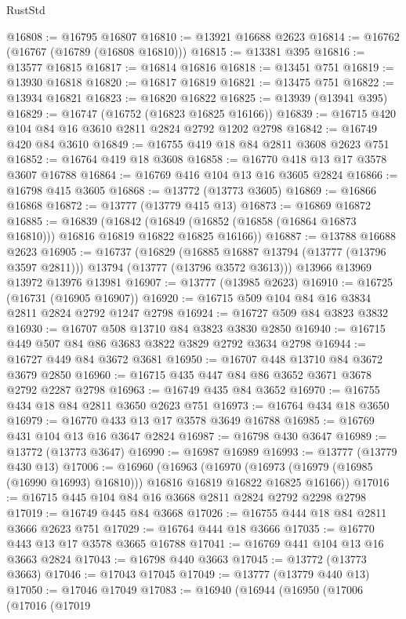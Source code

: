 \begin{lexlean}{RustStd}
\begin{coremodule}
@16808 := @16795 @16807
@16810 := @13921 @16688 @2623
@16814 := @16762 (@16767 (@16789 (@16808 @16810)))
@16815 := @13381 @395
@16816 := @13577 @16815
@16817 := @16814 @16816
@16818 := @13451 @751
@16819 := @13930 @16818
@16820 := @16817 @16819
@16821 := @13475 @751
@16822 := @13934 @16821
@16823 := @16820 @16822
@16825 := @13939 (@13941 @395)
@16829 := @16747 (@16752 (@16823 @16825 @16166))
@16839 := @16715 @420 @104 @84 @16 @3610 @2811 @2824 @2792 @1202 @2798
@16842 := @16749 @420 @84 @3610
@16849 := @16755 @419 @18 @84 @2811 @3608 @2623 @751
@16852 := @16764 @419 @18 @3608
@16858 := @16770 @418 @13 @17 @3578 @3607 @16788
@16864 := @16769 @416 @104 @13 @16 @3605 @2824
@16866 := @16798 @415 @3605
@16868 := @13772 (@13773 @3605)
@16869 := @16866 @16868
@16872 := @13777 (@13779 @415 @13)
@16873 := @16869 @16872
@16885 := @16839
    (@16842 (@16849 (@16852 (@16858 (@16864 @16873 @16810))) @16816 @16819 @16822 @16825 @16166))
@16887 := @13788 @16688 @2623
@16905 := @16737
    (@16829
      (@16885 @16887 @13794 (@13777 (@13796 @3597 @2811)))
      @13794
      (@13777 (@13796 @3572 @3613)))
    @13966
    @13969
    @13972
    @13976
    @13981
@16907 := @13777 (@13985 @2623)
@16910 := @16725 (@16731 (@16905 @16907))
@16920 := @16715 @509 @104 @84 @16 @3834 @2811 @2824 @2792 @1247 @2798
@16924 := @16727 @509 @84 @3823 @3832
@16930 := @16707 @508 @13710 @84 @3823 @3830 @2850
@16940 := @16715 @449 @507 @84 @86 @3683 @3822 @3829 @2792 @3634 @2798
@16944 := @16727 @449 @84 @3672 @3681
@16950 := @16707 @448 @13710 @84 @3672 @3679 @2850
@16960 := @16715 @435 @447 @84 @86 @3652 @3671 @3678 @2792 @2287 @2798
@16963 := @16749 @435 @84 @3652
@16970 := @16755 @434 @18 @84 @2811 @3650 @2623 @751
@16973 := @16764 @434 @18 @3650
@16979 := @16770 @433 @13 @17 @3578 @3649 @16788
@16985 := @16769 @431 @104 @13 @16 @3647 @2824
@16987 := @16798 @430 @3647
@16989 := @13772 (@13773 @3647)
@16990 := @16987 @16989
@16993 := @13777 (@13779 @430 @13)
@17006 := @16960
    (@16963
      (@16970 (@16973 (@16979 (@16985 (@16990 @16993) @16810))) @16816 @16819 @16822 @16825 @16166))
@17016 := @16715 @445 @104 @84 @16 @3668 @2811 @2824 @2792 @2298 @2798
@17019 := @16749 @445 @84 @3668
@17026 := @16755 @444 @18 @84 @2811 @3666 @2623 @751
@17029 := @16764 @444 @18 @3666
@17035 := @16770 @443 @13 @17 @3578 @3665 @16788
@17041 := @16769 @441 @104 @13 @16 @3663 @2824
@17043 := @16798 @440 @3663
@17045 := @13772 (@13773 @3663)
@17046 := @17043 @17045
@17049 := @13777 (@13779 @440 @13)
@17050 := @17046 @17049
@17083 := @16940
    (@16944
      (@16950
        (@17006
          (@17016
            (@17019

\end{coremodule}
\end{lexlean}
